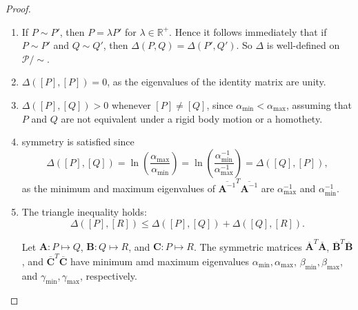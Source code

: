 \documentclass[a4paper, 12pt]{amsart}
\theoremstyle{plain}
\begin{document}
\begin{proof} \hfill
\begin{enumerate}

	\item If $P \sim P'$, then $P = \lambda P'$ for $\lambda \in \mathbb{R^+}$. Hence it follows immediately that if $P \sim P'$ and $Q \sim Q'$, then $\Delta(P,Q)=\Delta(P',Q')$. So $\Delta$ is well-defined on $\mathcal{P}/\sim$.
	
    \item $\Delta([P],[P])=0$, as the eigenvalues of the identity matrix are unity.
    
  \item $\Delta([P],[Q]) > 0$ whenever $[P] \neq [Q]$, since $\alpha_{\min} < \alpha_{\max}$, assuming that $P$ and $Q$ are not equivalent under a rigid body motion or a homothety.

    \item symmetry is satisfied since
    \begin{equation*}
        \Delta([P], [Q]) = \ln \left(\frac{\alpha_{\max}}{\alpha_{\min}}\right) = \ln \left(\frac{\alpha_{\min}^{-1}}{\alpha_{\max}^{-1}}\right) = \Delta([Q], [P]),
    \end{equation*}
    as the minimum and maximum eigenvalues of $\overline{\mathbf{A}^{-1}}^T \overline{\mathbf{A}^{-1}}$ are $\alpha_{\max}^{-1}$ and $\alpha_{\min}^{-1}$.
    
     \item The triangle inequality holds:
\begin{equation*}
    \Delta([P], [R]) \leq \Delta([P], [Q]) + \Delta([Q], [R]).
\end{equation*}

    Let $\mathbf{A}: P \mapsto Q$, $\mathbf{B}: Q \mapsto R$, and $\mathbf{C}: P \mapsto R$. The symmetric matrices $\overline{\mathbf{A}}^T \overline{\mathbf{A}}$, $\overline{\mathbf{B}}^T \overline{\mathbf{B}}$, and $\overline{\mathbf{C}}^T \overline{\mathbf{C}}$ have minimum amd maximum eigenvalues $\alpha_{\min}, \alpha_{\max}$, $\beta_{\min}, \beta_{\max}$, and $\gamma_{\min}, \gamma_{\max}$, respectively.  


\end{enumerate}
\end{proof}
\end{document}
